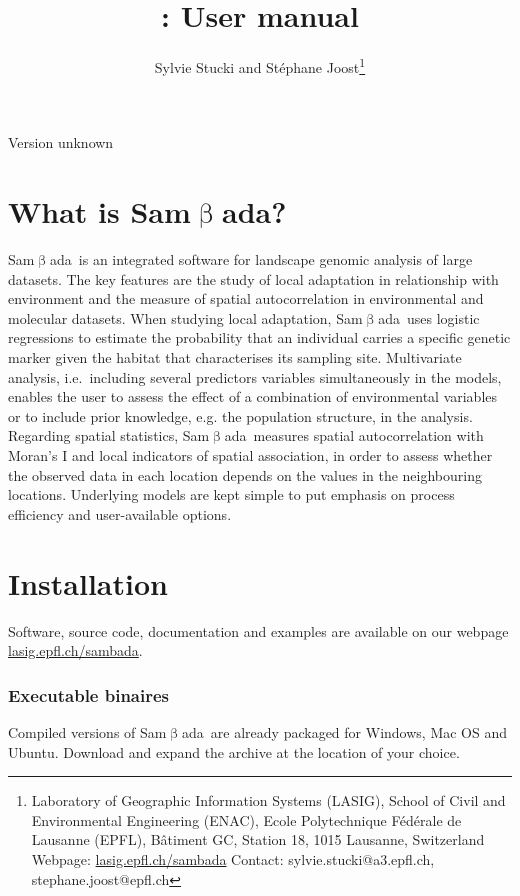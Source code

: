 \documentclass[a4paper,11pt]{article}
\title{\smb: User manual}
\author{Sylvie Stucki and Stéphane Joost\footnote{
Laboratory of Geographic Information Systems (LASIG), School of Civil and Environmental Engineering (ENAC), Ecole Polytechnique Fédérale de Lausanne (EPFL), Bâtiment GC, Station 18, 1015 Lausanne, Switzerland \newline
Webpage: \protect\url{lasig.epfl.ch/sambada} \newline Contact: sylvie.stucki@a3.epfl.ch, stephane.joost@epfl.ch
}}
\newcommand{\versionnum}{unknown}
\newcommand{\smb}{\textsf{Sam$\upbeta$ada}}
\newcommand{\smbtitre}{\protect\texorpdfstring{\smb}{Samßada}}
\begin{document}
\maketitle

\vspace{-1.25cm}
\begin{center}
\small Version \versionnum
\end{center}

\vfill

\tableofcontents

\vfill

\clearpage

\section{What is \smbtitre?}

\smb\ is an integrated software for landscape genomic analysis of large datasets. 
The key features are the study of local adaptation in relationship with environment and the measure of spatial autocorrelation in environmental and molecular datasets.
When studying local adaptation, \smb\ uses logistic regressions to estimate the probability that an individual carries a specific genetic marker given the habitat that characterises its sampling site.
Multivariate analysis, i.e.~including several predictors variables simultaneously in the models, enables the user to assess the effect of a combination of environmental variables or to include prior knowledge, e.g. the population structure, in the analysis.
Regarding spatial statistics, \smb\ measures spatial autocorrelation with Moran's I and local indicators of spatial association, in order to assess whether the observed data in each location depends on the values in the neighbouring locations.
Underlying models are kept simple to put emphasis on process efficiency and user-available options.



\section{Installation}
Software, source code, documentation and examples are available on our webpage \url{lasig.epfl.ch/sambada}.

\subsubsection*{Executable binaires}
Compiled versions of \smb\ are already packaged for Windows, Mac OS and Ubuntu.
Download and expand the archive at the location of your choice.
\end{document}
